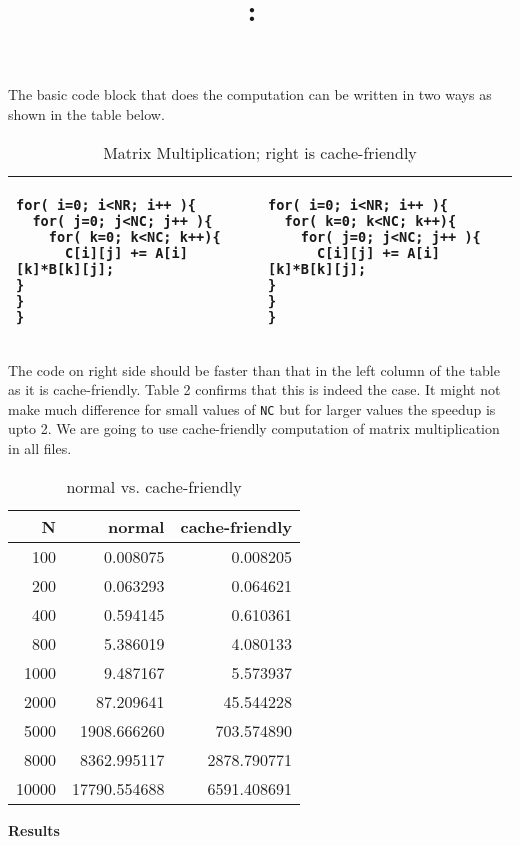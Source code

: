 \documentclass{article}
\title{
	\vspace{2in}
	\textmd{\textbf{\hmwkClass:\ \hmwkTitle}}\\
	\vspace{3in}
}
\author{\textbf{\hmwkAuthorName}}
\date{} %
\begin{document}


The basic code block that does the computation can be written in two ways
as shown in the table below. 
\begin{table}[h]

	\caption{Matrix Multiplication; right is cache-friendly}
	\begin{center}
	\begin{tabular}{| l | l |}

			\hline 
			\begin{lstlisting}
for( i=0; i<NR; i++ ){
  for( j=0; j<NC; j++ ){
    for( k=0; k<NC; k++){
	  C[i][j] += A[i][k]*B[k][j];
}
}
}
			\end{lstlisting} 
			&
			\begin{lstlisting}
for( i=0; i<NR; i++ ){
  for( k=0; k<NC; k++){
    for( j=0; j<NC; j++ ){
	  C[i][j] += A[i][k]*B[k][j];
}
}
}
			\end{lstlisting} \\ 
			\hline

		\end{tabular}
	\end{center}

\end{table}
The code on right side should be faster than that in 
the left column of the table as it is cache-friendly. Table 2 confirms that this is indeed the case. It might not make
much difference for small values of \verb+NC+ but for larger values
the speedup is upto 2. We are going to use cache-friendly computation of matrix multiplication
in all files.

\begin{table}[h]
	\caption{normal vs. cache-friendly }
	\begin{center}
	\begin{tabular}{| r | r | r |}
		\hline
		N & normal & cache-friendly \\ \hline
		100&0.008075 & 0.008205 \\ \hline
		200&0.063293&0.064621 \\ \hline
		400&0.594145&0.610361 \\ \hline
		800&5.386019&4.080133 \\ \hline
		1000&9.487167&5.573937 \\ \hline
		2000&87.209641&45.544228 \\ \hline
		5000&1908.666260&703.574890 \\ \hline
		8000&8362.995117&2878.790771 \\ \hline
		10000&17790.554688&6591.408691 \\ \hline
	\end{tabular}
\end{center}
\end{table}
\newpage
\textbf{Results}
\end{document}
